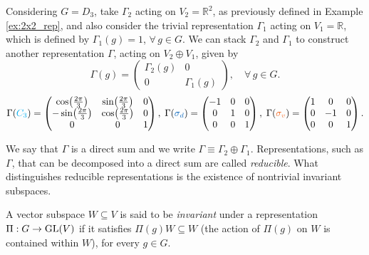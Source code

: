 \begin{example} \label{ex:direct_sum}
Considering $G = D_3$, take $\Gamma_2$ acting on $V_2 = \mathbb{R}^2$, as previously defined in Example \ref{ex:2x2_rep}, and also consider the trivial representation $\Gamma_1$ acting on $V_1 = \mathbb{R}$, which is defined by $\Gamma_1(g) = 1$, $\forall \, g \in G$. We can stack $\Gamma_2$ and $\Gamma_1$ to construct another representation $\Gamma$, acting on $V_2 \oplus V_1$, given by
\begin{equation} \label{eq:block_diagonal_Gamma_2_1}
\Gamma(g) =
\begin{pmatrix}
\Gamma_2(g) & 0 \\
0 & \Gamma_1(g)
\end{pmatrix}, \quad \forall \, g \in G.
\end{equation}
\begin{equation} \label{eq:D6_generators_3x3matrices}
\Gamma(\Ct) =
\begin{pmatrix}
\cos(\frac{2\pi}{3}) & \sin(\frac{2\pi}{3}) & 0 \\
-\sin(\frac{2\pi}{3}) & \cos(\frac{2\pi}{3}) & 0 \\
0 & 0 & 1
\end{pmatrix},
\;
\Gamma(\sd) =
\begin{pmatrix}
-1 & 0 & 0 \\
0 & 1 & 0 \\
0 & 0 & 1
\end{pmatrix},
\;
\Gamma(\sv) =
\begin{pmatrix}
1 & 0 & 0 \\
0 & -1 & 0 \\
0 & 0 & 1
\end{pmatrix}.
\end{equation}

We say that $\Gamma$ is a direct sum and we write $\Gamma \equiv \Gamma_2 \oplus \Gamma_1$. Representations, such as $\Gamma$, that can be decomposed into a direct sum are called \textit{reducible}. What distinguishes reducible representations is the existence of nontrivial invariant subspaces.
\end{example}

\begin{definition}
A vector subspace $W \subseteq V$ is said to be \textit{invariant} under a representation $\Pi: G \to {\text{GL}}(V)$ if it satisfies $\Pi(g) W \subseteq W$ (the action of $\Pi(g)$ on $W$ is contained within $W$), for every $g \in G$.
\end{definition}

